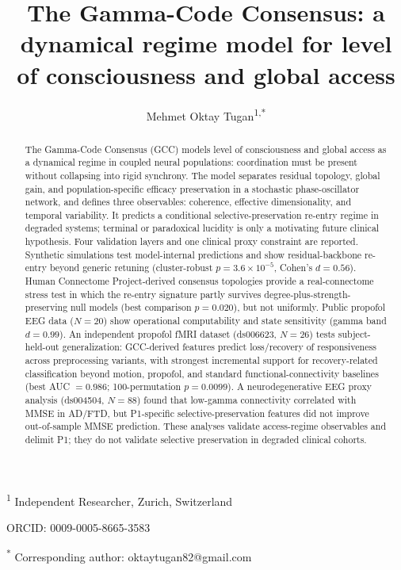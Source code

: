 \documentclass[11pt,a4paper]{article}
\title{%
  \textbf{The Gamma-Code Consensus: a dynamical regime model for level of consciousness and global access}
}
\author{%
  Mehmet Oktay Tugan\textsuperscript{1,*}
}
\date{}
\theoremstyle{plain}
\theoremstyle{definition}
\theoremstyle{remark}
\begin{document}
\maketitle
\thispagestyle{fancy}

\noindent
\textsuperscript{1} Independent Researcher, Zurich, Switzerland

\noindent
ORCID: 0009-0005-8665-3583

\noindent
\textsuperscript{*} Corresponding author: oktaytugan82@gmail.com

\bigskip

\begin{abstract}
\noindent
The Gamma-Code Consensus (GCC) models level of consciousness and global access as a dynamical regime in coupled neural populations: coordination must be present without collapsing into rigid synchrony. The model separates residual topology, global gain, and population-specific efficacy preservation in a stochastic phase-oscillator network, and defines three observables: coherence, effective dimensionality, and temporal variability. It predicts a conditional selective-preservation re-entry regime in degraded systems; terminal or paradoxical lucidity is only a motivating future clinical hypothesis. Four validation layers and one clinical proxy constraint are reported. Synthetic simulations test model-internal predictions and show residual-backbone re-entry beyond generic retuning (cluster-robust $p = 3.6 \times 10^{-5}$, Cohen's $d = 0.56$). Human Connectome Project-derived consensus topologies provide a real-connectome stress test in which the re-entry signature partly survives degree-plus-strength-preserving null models (best comparison $p = 0.020$), but not uniformly. Public propofol EEG data ($N = 20$) show operational computability and state sensitivity (gamma band $d = 0.99$). An independent propofol fMRI dataset (ds006623, $N = 26$) tests subject-held-out generalization: GCC-derived features predict loss/recovery of responsiveness across preprocessing variants, with strongest incremental support for recovery-related classification beyond motion, propofol, and standard functional-connectivity baselines (best AUC $= 0.986$; 100-permutation $p = 0.0099$). A neurodegenerative EEG proxy analysis (ds004504, $N = 88$) found that low-gamma connectivity correlated with MMSE in AD/FTD, but P1-specific selective-preservation features did not improve out-of-sample MMSE prediction. These analyses validate access-regime observables and delimit P1; they do not validate selective preservation in degraded clinical cohorts.
\end{abstract}
\end{document}
